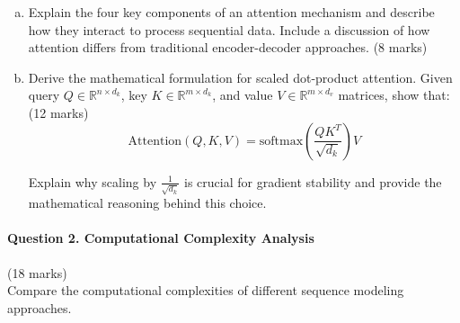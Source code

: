 \documentclass[12pt]{article}
\newcommand{\mediumanswer}{\vspace{3cm}}         %
\newcommand{\journalspace}{\vspace{4.5cm}}       %
\begin{document}
\begin{enumerate}[(a)]
    \item Explain the four key components of an attention mechanism and describe how they interact to process sequential data. Include a discussion of how attention differs from traditional encoder-decoder approaches. \hfill (8 marks)
    
    \mediumanswer
    
    \item Derive the mathematical formulation for scaled dot-product attention. Given query $Q \in \mathbb{R}^{n \times d_k}$, key $K \in \mathbb{R}^{m \times d_k}$, and value $V \in \mathbb{R}^{m \times d_v}$ matrices, show that: \hfill (12 marks)
    $$\text{Attention}(Q,K,V) = \text{softmax}\left(\frac{QK^T}{\sqrt{d_k}}\right)V$$
    
    Explain why scaling by $\frac{1}{\sqrt{d_k}}$ is crucial for gradient stability and provide the mathematical reasoning behind this choice.
    
    \journalspace
\end{enumerate}

\newpage
\paragraph{Question 2. Computational Complexity Analysis}\hfill (18 marks)\\
Compare the computational complexities of different sequence modeling approaches.
\end{document}
